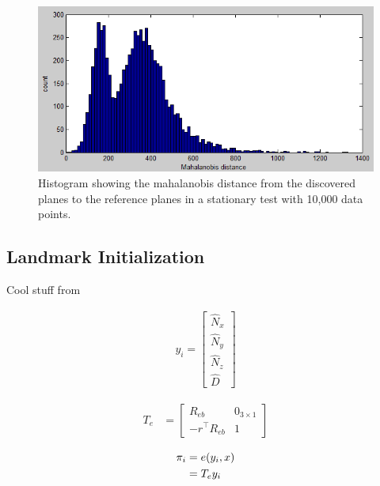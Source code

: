 \documentclass[]{article}
\begin{document}
{%


\begin{figure}[tb]
	\begin{center}
		\includegraphics[width = \textwidth]{malhala_hist_100bins_10000datapoints_notmoving22}
	\end{center}
	\caption{Histogram showing the mahalanobis distance from the discovered planes to the reference planes in a stationary test with 10,000 data points.}
	\label{fig:mahaldisthist}
\end{figure}


\subsection{Landmark Initialization} %
\label{sub:landmark_initialization}

Cool stuff from \cite{Sola2013}

\begin{align}
	y_i = 
	\left[
	\begin{matrix}
		\hat{N}_x \\
		\hat{N}_y \\
		\hat{N}_z \\
		\hat{D}
	\end{matrix}
	\right]
\end{align}

\begin{align}
	T_e &= 
	\left[
	\begin{matrix}
		R_{eb} 			& 0_{3\times1} \\
		-r^\top R_{eb}	& 1
	\end{matrix}
	\right]
\end{align}

\begin{align}
	\pi_i	&= e(y_i,x) \notag \\
			&= T_e y_i
\end{align}

}
\end{document}
